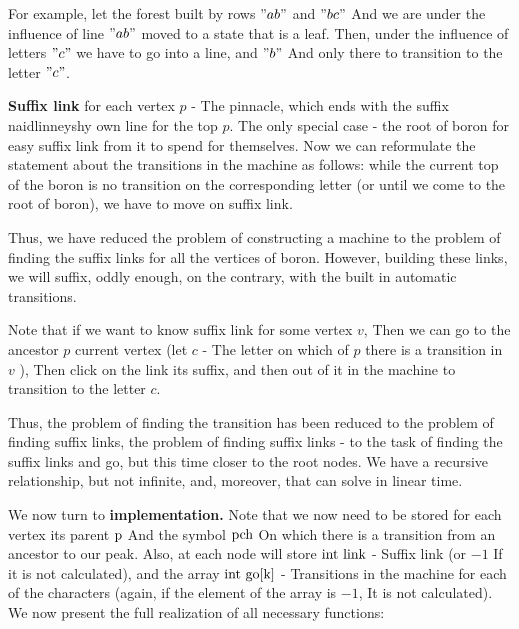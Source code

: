 For example, let the forest built by rows $" ab"$ and $" bc"$ And we are under the influence of line $" ab"$ moved to a state that is a leaf. Then, under the influence of letters $" c"$ we have to go into a line, and $" b"$ And only there to transition to the letter $" c"$.

\textbf{Suffix link} for each vertex $p$ - The pinnacle, which ends with the suffix naidlinneyshy own line for the top $p$. The only special case - the root of boron for easy suffix link from it to spend for themselves. Now we can reformulate the statement about the transitions in the machine as follows: while the current top of the boron is no transition on the corresponding letter (or until we come to the root of boron), we have to move on suffix link.

Thus, we have reduced the problem of constructing a machine to the problem of finding the suffix links for all the vertices of boron. However, building these links, we will suffix, oddly enough, on the contrary, with the built in automatic transitions.

Note that if we want to know suffix link for some vertex $v$, Then we can go to the ancestor $p$ current vertex (let $c$ - The letter on which of $p$ there is a transition in $v$ ), Then click on the link its suffix, and then out of it in the machine to transition to the letter $c$.

Thus, the problem of finding the transition has been reduced to the problem of finding suffix links, the problem of finding suffix links - to the task of finding the suffix links and go, but this time closer to the root nodes. We have a recursive relationship, but not infinite, and, moreover, that can solve in linear time.

We now turn to \textbf{implementation.} Note that we now need to be stored for each vertex its parent $\rm p$ And the symbol $\rm pch$ On which there is a transition from an ancestor to our peak. Also, at each node will store $\rm int ~ link$ - Suffix link (or $-1$ If it is not calculated), and the array $\rm int ~ go [k]$ - Transitions in the machine for each of the characters (again, if the element of the array is $-1$, It is not calculated). We now present the full realization of all necessary functions:

